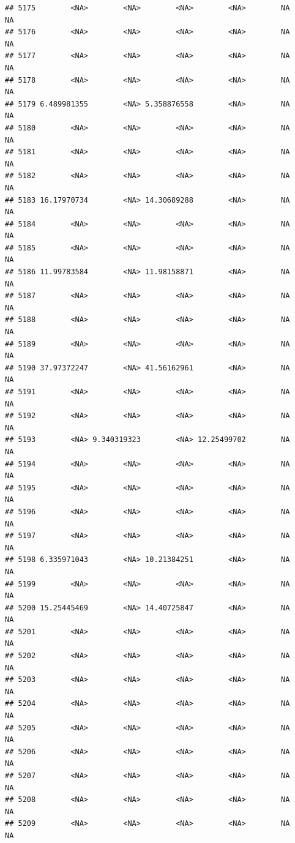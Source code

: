 \documentclass[12pt, a4paper]{article}\usepackage[]{graphicx}\usepackage[]{color}
\makeatletter
\newenvironment{kframe}{%
 \def\at@end@of@kframe{}%
 \ifinner\ifhmode%
  \def\at@end@of@kframe{\end{minipage}}%
  \begin{minipage}{\columnwidth}%
 \fi\fi%
 \def\FrameCommand##1{\hskip\@totalleftmargin \hskip-\fboxsep
 \colorbox{shadecolor}{##1}\hskip-\fboxsep
     \hskip-\linewidth \hskip-\@totalleftmargin \hskip\columnwidth}%
 \MakeFramed {\advance\hsize-\width
   \@totalleftmargin\z@ \linewidth\hsize
   \@setminipage}}%
 {\par\unskip\endMakeFramed%
 \at@end@of@kframe}
\newenvironment{knitrout}{}{} %
\makeatother
\begin{document}
\begin{knitrout}
\begin{kframe}
\begin{verbatim}
## 5175        <NA>        <NA>        <NA>        <NA>        NA        NA
## 5176        <NA>        <NA>        <NA>        <NA>        NA        NA
## 5177        <NA>        <NA>        <NA>        <NA>        NA        NA
## 5178        <NA>        <NA>        <NA>        <NA>        NA        NA
## 5179 6.489981355        <NA> 5.358876558        <NA>        NA        NA
## 5180        <NA>        <NA>        <NA>        <NA>        NA        NA
## 5181        <NA>        <NA>        <NA>        <NA>        NA        NA
## 5182        <NA>        <NA>        <NA>        <NA>        NA        NA
## 5183 16.17970734        <NA> 14.30689288        <NA>        NA        NA
## 5184        <NA>        <NA>        <NA>        <NA>        NA        NA
## 5185        <NA>        <NA>        <NA>        <NA>        NA        NA
## 5186 11.99783584        <NA> 11.98158871        <NA>        NA        NA
## 5187        <NA>        <NA>        <NA>        <NA>        NA        NA
## 5188        <NA>        <NA>        <NA>        <NA>        NA        NA
## 5189        <NA>        <NA>        <NA>        <NA>        NA        NA
## 5190 37.97372247        <NA> 41.56162961        <NA>        NA        NA
## 5191        <NA>        <NA>        <NA>        <NA>        NA        NA
## 5192        <NA>        <NA>        <NA>        <NA>        NA        NA
## 5193        <NA> 9.340319323        <NA> 12.25499702        NA        NA
## 5194        <NA>        <NA>        <NA>        <NA>        NA        NA
## 5195        <NA>        <NA>        <NA>        <NA>        NA        NA
## 5196        <NA>        <NA>        <NA>        <NA>        NA        NA
## 5197        <NA>        <NA>        <NA>        <NA>        NA        NA
## 5198 6.335971043        <NA> 10.21384251        <NA>        NA        NA
## 5199        <NA>        <NA>        <NA>        <NA>        NA        NA
## 5200 15.25445469        <NA> 14.40725847        <NA>        NA        NA
## 5201        <NA>        <NA>        <NA>        <NA>        NA        NA
## 5202        <NA>        <NA>        <NA>        <NA>        NA        NA
## 5203        <NA>        <NA>        <NA>        <NA>        NA        NA
## 5204        <NA>        <NA>        <NA>        <NA>        NA        NA
## 5205        <NA>        <NA>        <NA>        <NA>        NA        NA
## 5206        <NA>        <NA>        <NA>        <NA>        NA        NA
## 5207        <NA>        <NA>        <NA>        <NA>        NA        NA
## 5208        <NA>        <NA>        <NA>        <NA>        NA        NA
## 5209        <NA>        <NA>        <NA>        <NA>        NA        NA

\end{verbatim}
\end{kframe}
\end{knitrout}
\end{document}
